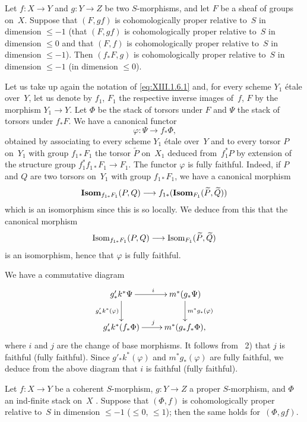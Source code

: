 \begin{corollary}
\label{XIII.1.7}
Let $f \colon X \to Y$ and $g \colon Y \to Z$ be two $S$-morphisms,
and let $F$ be a sheaf of groups on~$X$. Suppose that $(F,gf)$
is cohomologically proper relative to~$S$ in dimension
$\leqslant -1$ (\resp that $(F,gf)$ is cohomologically proper
relative to~$S$ in dimension $\leqslant 0$ and that $(F,f)$ is
cohomologically proper relative to~$S$ in dimension
$\leqslant -1$). Then $(f_* F, g)$ is cohomologically proper
relative to~$S$ in dimension $\leqslant -1$ (\resp in dimension
$\leqslant 0$).
\end{corollary}

Let us take up again the notation of \eqref{eq:XIII.1.6.1} and, for every
scheme $Y_1$ \'etale over~$Y$, let us denote by $f_1$, $F_1$ the
respective inverse images of~$f$, $F$ by the morphism $Y_1 \to
Y$. Let $\Phi$ be the stack of torsors under $F$ and $\Psi$ the stack
of torsors under $f_* F$. We have a canonical functor
$$
\varphi \colon \Psi \to f_* \Phi \text{,}
$$
obtained by associating to every scheme $Y_1$ \'etale over~$Y$ and
to every torsor $P$ on~$Y_1$ with group $f_{1 *}F_1$ the torsor
$\tilde{P}$ on~$X_1$ deduced from~$f_1^* P$ by extension of the
structure group $f_1^* f_{1 *}F_1 \to F_1$. The functor
$\varphi$ is fully faithful. Indeed, if $P$ and $Q$ are two
torsors on~$Y_1$ with group $f_{1 *} F_1$, we have a canonical
morphism
$$
\SheafIsom_{f_{1 *}F_1}(P,Q) \to
f_{1*}(\SheafIsom_{F_1}(\tilde{P},\tilde{Q}))
$$
which
is an isomorphism since this is so locally. We deduce from this
that the canonical morphism
$$
\Isom_{f_{1 *}F_1}(P,Q) \to \Isom_{F_1}(\tilde{P},\tilde{Q})
$$
is an isomorphism, hence that $\varphi$ is fully faithful.

We have a commutative diagram
$$
\xymatrix{ g'_* k^* \Psi \ar[r]^i \ar[d]_{g'_*
k^*(\varphi)} & m^*(g_* \Psi) \ar[d]^{m^*
g_*(\varphi)} \\ g'_* k^*(f_* \Phi) \ar[r]^j &
m^*(g_* f_* \Phi)\text{,} }
$$
where $i$ and $j$ are the change of base morphisms. It
follows from~ 2) that $j$ is faithful
(\resp fully faithful). Since $g'_* k^* (\varphi)$ and
$m^* g_* (\varphi)$ are fully faithful, we deduce
from the above diagram that $i$ is faithful (\resp fully
faithful).

\begin{corollary}
\label{XIII.1.8}
Let $f \colon X \to Y$ be a coherent $S$-morphism, $g \colon Y
\to Z$ a proper $S$-morphism, and $\Phi$ an ind-finite stack on~$X$ \textup{\cite[VII 2.2.1]{XIII.2}}. Suppose that $(\Phi,f)$ is cohomologically proper
relative to~$S$ in dimension $\leqslant -1$ (\resp $\leqslant
0$, \resp $\leqslant 1$); then the same holds for~$(\Phi, gf)$.
\end{corollary}


